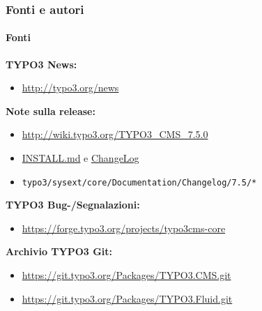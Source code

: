 \begin{frame}[fragile]
	\frametitle{Fonti e autori}
	\framesubtitle{Fonti}

	\textbf{TYPO3 News:}
		\begin{itemize}\smaller
			\item \url{http://typo3.org/news}
		\end{itemize}

	\textbf{Note sulla release:}
		\begin{itemize}\smaller
			\item \url{http://wiki.typo3.org/TYPO3_CMS_7.5.0}
			\item \href{https://github.com/TYPO3/TYPO3.CMS/blob/master/INSTALL.md}{INSTALL.md} e \href{https://github.com/TYPO3/TYPO3.CMS/blob/master/ChangeLog}{ChangeLog}
			\item \texttt{typo3/sysext/core/Documentation/Changelog/7.5/*}
		\end{itemize}

	\textbf{TYPO3 Bug-/Segnalazioni:}
		\begin{itemize}\smaller
			\item \url{https://forge.typo3.org/projects/typo3cms-core}
		\end{itemize}

	\textbf{Archivio TYPO3 Git:}
		\begin{itemize}\smaller
			\item \url{https://git.typo3.org/Packages/TYPO3.CMS.git}
			\item \url{https://git.typo3.org/Packages/TYPO3.Fluid.git}
		\end{itemize}

\end{frame}


